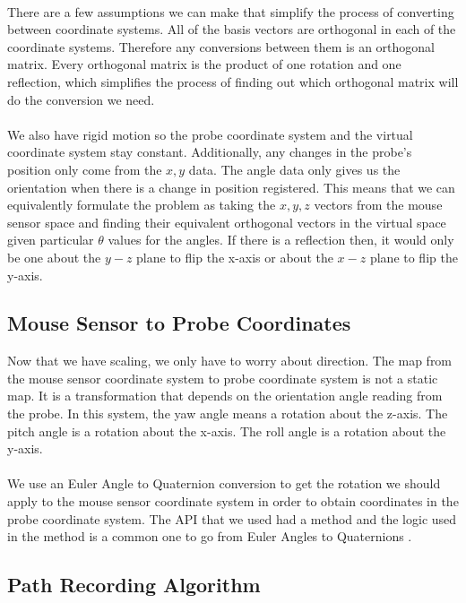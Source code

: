 \documentclass[conference]{acmsiggraph}
\begin{document}
\\
There are a few assumptions we can make that simplify the process of converting between coordinate systems. All of the basis vectors are orthogonal in each of the coordinate systems. Therefore any conversions between them is an orthogonal matrix. Every orthogonal matrix is the product of one rotation and one reflection, which simplifies the process of finding out which orthogonal matrix will do the conversion we need. \\
\\
We also have rigid motion so the probe coordinate system and the virtual coordinate system stay constant. Additionally, any changes in the probe's position only come from the $x,y$ data. The angle data only gives us the orientation when there is a change in position registered. This means that we can equivalently formulate the problem as taking the $x,y,z$ vectors from the mouse sensor space and finding their equivalent orthogonal vectors in the virtual space given particular $\theta$ values for the angles. If there is a reflection then, it would only be one about the $y-z$ plane to flip the x-axis or about the $x-z$ plane to flip the y-axis. 

\subsection{Mouse Sensor to Probe Coordinates}

Now that we have scaling, we only have to worry about direction. The map from the mouse sensor coordinate system to probe coordinate system is not a static map. It is a transformation that depends on the orientation angle reading from the probe. In this system, the yaw angle means a rotation about the z-axis. The pitch angle is a rotation about the x-axis. The roll angle is a rotation about the y-axis. \\
\\
We use an Euler Angle to Quaternion conversion to get the rotation we should apply to the mouse sensor coordinate system in order to obtain coordinates in the probe coordinate system. The API that we used had a method \cite{jmonkeyrotation} and the logic used in the method is a common one to go from Euler Angles to Quaternions \cite{quaternionTextboook}.

\subsection{Path Recording Algorithm}
\end{document}
